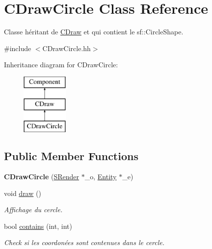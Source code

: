 \hypertarget{class_c_draw_circle}{}\section{C\+Draw\+Circle Class Reference}
\label{class_c_draw_circle}


Classe héritant de \hyperlink{class_c_draw}{C\+Draw} et qui contient le sf\+::\+Circle\+Shape.  




{\ttfamily \#include $<$C\+Draw\+Circle.\+hh$>$}

Inheritance diagram for C\+Draw\+Circle\+:\begin{figure}[H]
\begin{center}
\leavevmode
\includegraphics[height=3.000000cm]{class_c_draw_circle}
\end{center}
\end{figure}
\subsection*{Public Member Functions}
\begin{DoxyCompactItemize}
\item 
\hypertarget{class_c_draw_circle_ab04ac44826b605d5712db0057a8319f2}{}{\bfseries C\+Draw\+Circle} (\hyperlink{class_s_render}{S\+Render} $\ast$\+\_\+o, \hyperlink{class_entity}{Entity} $\ast$\+\_\+e)\label{class_c_draw_circle_ab04ac44826b605d5712db0057a8319f2}

\item 
\hypertarget{class_c_draw_circle_ab24d4d6ce1a9baa6354a623641d31df9}{}void \hyperlink{class_c_draw_circle_ab24d4d6ce1a9baa6354a623641d31df9}{draw} ()\label{class_c_draw_circle_ab24d4d6ce1a9baa6354a623641d31df9}

\begin{DoxyCompactList}\small\item\em Affichage du cercle. \end{DoxyCompactList}\item 
bool \hyperlink{class_c_draw_circle_a5e05f05f8b936df0761435e4271b3ba2}{contains} (int, int)
\begin{DoxyCompactList}\small\item\em Check si les coordonées sont contenues dans le cercle. \end{DoxyCompactList}\end{DoxyCompactItemize}
